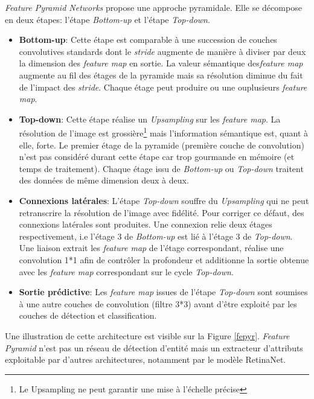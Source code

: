 \noindent \textit{Feature Pyramid Networks} propose une approche pyramidale. Elle se décompose en deux étapes: l'étape \textit{Bottom-up} et l'étape \textit{Top-down}.
\begin{itemize}
    \item \textbf{Bottom-up}: Cette étape est comparable à une succession de couches convolutives standards dont le \textit{stride} augmente de manière à diviser par deux la dimension des \textit{feature map} en sortie. La valeur sémantique des\textit{feature map} augmente au fil des étages de la pyramide mais sa résolution diminue du fait de l'impact des \textit{stride}. Chaque étage peut produire ou une ouplusieurs \textit{feature map}.

    \item \textbf{Top-down}: Cette étape réalise un \textit{Upsampling} sur les \textit{feature map}. La résolution de l'image est grossière\footnote{Le Upsampling ne peut garantir une mise à l'échelle précise} mais l'information sémantique est, quant à elle, forte. Le premier étage de la pyramide (première couche de convolution) n'est pas considéré durant cette étape car trop gourmande en mémoire (et temps de traitement). Chaque étage issu de \textit{Bottom-up} ou \textit{Top-down} traitent des données de même dimension deux à deux.

    \item \textbf{Connexions latérales}: L'étape \textit{Top-down} souffre du \textit{Upsampling} qui ne peut retranscrire la résolution de l'image avec fidélité. Pour corriger ce défaut, des connexions latérales sont produites. Une connexion relie deux étages respectivement, i.e l'étage 3 de \textit{Bottom-up} est lié à l'étage 3 de \textit{Top-down}. Une liaison extrait les \textit{feature map} de l'étage correspondant, réalise une convolution 1*1 afin de contrôler la profondeur et additionne la sortie obtenue avec les \textit{feature map} correspondant sur le cycle \textit{Top-down}.

    \item \textbf{Sortie prédictive}: Les \textit{feature map} issues de l'étape \textit{Top-down} sont soumises à une autre couches de convolution (filtre 3*3) avant d'être exploité par les couches de détection et classification.
\end{itemize}

\noindent Une illustration de cette architecture est visible sur la Figure \ref{fepyr}. \textit{Feature Pyramid} n'est pas un réseau de détection d'entité mais un extracteur d'attributs exploitable par d'autres architectures, notamment par le modèle RetinaNet.

